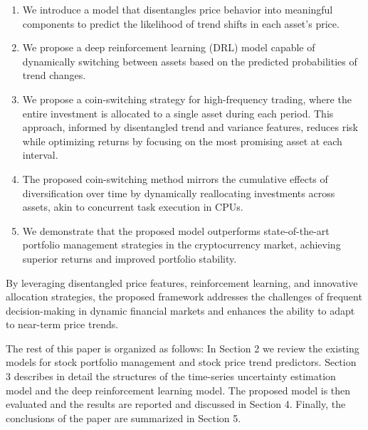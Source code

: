 \begin{enumerate}
	\item We introduce a model that disentangles price behavior into meaningful components to predict the likelihood of trend shifts in each asset's price.
	\item We propose a deep reinforcement learning (DRL) model capable of dynamically switching between assets based on the predicted probabilities of trend changes.
	\item We propose a coin-switching strategy for high-frequency trading, where the entire investment is allocated to a single asset during each period. This approach, informed by disentangled trend and variance features, reduces risk while optimizing returns by focusing on the most promising asset at each interval.
	\item The proposed coin-switching method mirrors the cumulative effects of diversification over time by dynamically reallocating investments across assets, akin to concurrent task execution in CPUs.
	\item We demonstrate that the proposed model outperforms state-of-the-art portfolio management strategies in the cryptocurrency market, achieving superior returns and improved portfolio stability.
\end{enumerate}

By leveraging disentangled price features, reinforcement learning, and innovative allocation strategies, the proposed framework addresses the challenges of frequent decision-making in dynamic financial markets and enhances the ability to adapt to near-term price trends.

The rest of this paper is organized as follows: In Section 2 we review the existing models for stock portfolio management and stock price trend predictors. Section 3 describes in detail the structures of the time-series uncertainty estimation model and the deep reinforcement learning model. The proposed model is then evaluated and the results are reported and discussed in Section 4. Finally, the conclusions of the paper are summarized in Section 5.